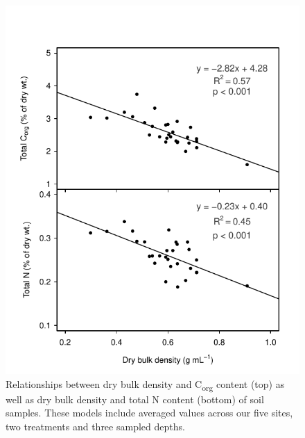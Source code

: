 \begin{figure}
  \centering
  \includegraphics[width=.85\textwidth]{Figures/chapter1/fig3}
\caption[Relationships between dry bulk density and C\textsubscript{org} content]{Relationships between dry bulk density and C\textsubscript{org} content (top) as well as dry bulk density and total N content (bottom) of soil samples. These models include averaged values across our five sites, two treatments and three sampled depths.}
  \label{fig:1fig3}
\end{figure}

